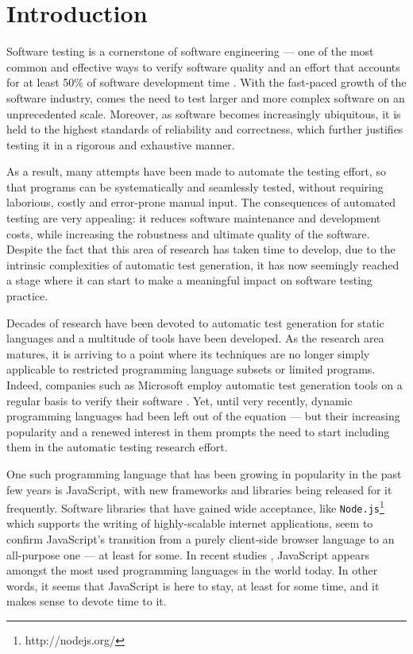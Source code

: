 \documentclass[a4paper,11pt,titlepage]{report}
\begin{document}
\tableofcontents

\chapter{Introduction}

Software testing is a cornerstone of software engineering --- one of the most common and effective ways to verify software quality and an effort that accounts for at least 50\% of software development time \cite{tahbildar2automated}. With the fast-paced growth of the software industry, comes the need to test larger and more complex software on an unprecedented scale. Moreover, as software becomes increasingly ubiquitous, it is held to the highest standards of reliability and correctness, which further justifies testing it in a rigorous and exhaustive manner.

As a result, many attempts have been made to automate the testing effort, so that programs can be systematically and seamlessly tested, without requiring laborious, costly and error-prone manual input. The consequences of automated testing are very appealing: it reduces software maintenance and development costs, while increasing the robustness and ultimate quality of the software. Despite the fact that this area of research has taken time to develop, due to the intrinsic complexities of automatic test generation, it has now seemingly reached a stage where it can start to make a meaningful impact on software testing practice.

Decades of research have been devoted to automatic test generation for static languages and a multitude of tools have been developed. As the research area matures, it is arriving to a point where its techniques are no longer simply applicable to restricted programming language subsets or limited programs. Indeed, companies such as Microsoft employ automatic test generation tools on a regular basis to verify their software \cite{păsăreanu2009survey}. Yet, until very recently, dynamic programming languages had been left out of the equation --- but their increasing popularity and a renewed interest in them prompts the need to start including them in the automatic testing research effort.

One such programming language that has been growing in popularity in the past few years is JavaScript, with new frameworks and libraries being released for it frequently. Software libraries that have gained wide acceptance, like \texttt{Node.js}\footnote{http://nodejs.org/} which supports the writing of highly-scalable internet applications, seem to confirm JavaScript's transition from a purely client-side browser language to an all-purpose one --- at least for some. In recent studies \cite{website:langpop}, JavaScript appears amongst the most used programming languages in the world today. In other words, it seems that JavaScript is here to stay, at least for some time, and it makes sense to devote time to it.
\end{document}

